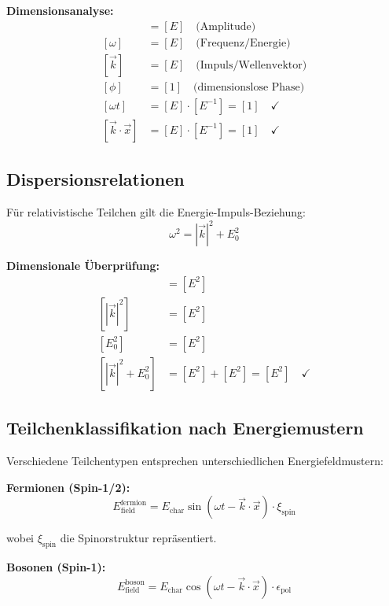 \documentclass[12pt,a4paper]{report}
\begin{document}
	\textbf{Dimensionsanalyse:}
	\begin{align}
		[E_0] &= [E] \quad \text{(Amplitude)} \\
		[\omega] &= [E] \quad \text{(Frequenz/Energie)} \\
		[\vec{k}] &= [E] \quad \text{(Impuls/Wellenvektor)} \\
		[\phi] &= [1] \quad \text{(dimensionslose Phase)} \\
		[\omega t] &= [E] \cdot [E^{-1}] = [1] \quad \checkmark \\
		[\vec{k} \cdot \vec{x}] &= [E] \cdot [E^{-1}] = [1] \quad \checkmark
	\end{align}
	
	\subsection{Dispersionsrelationen}
	\label{subsec:dispersion_relations}
	
	Für relativistische Teilchen gilt die Energie-Impuls-Beziehung:
	\begin{equation}
		\omega^2 = |\vec{k}|^2 + E_0^2
	\end{equation}
	
	\textbf{Dimensionale Überprüfung:}
	\begin{align}
		[\omega^2] &= [E^2] \\
		[|\vec{k}|^2] &= [E^2] \\
		[E_0^2] &= [E^2] \\
		[|\vec{k}|^2 + E_0^2] &= [E^2] + [E^2] = [E^2] \quad \checkmark
	\end{align}
	
	\subsection{Teilchenklassifikation nach Energiemustern}
	\label{subsec:energy_patterns}
	
	Verschiedene Teilchentypen entsprechen unterschiedlichen Energiefeldmustern:
	
	\textbf{Fermionen (Spin-1/2):}
	\begin{equation}
		E_{\text{field}}^{\text{fermion}} = E_{\text{char}} \sin(\omega t - \vec{k} \cdot \vec{x}) \cdot \xi_{\text{spin}}
	\end{equation}
	
	wobei $\xi_{\text{spin}}$ die Spinorstruktur repräsentiert.
	
	\textbf{Bosonen (Spin-1):}
	\begin{equation}
		E_{\text{field}}^{\text{boson}} = E_{\text{char}} \cos(\omega t - \vec{k} \cdot \vec{x}) \cdot \epsilon_{\text{pol}}
	\end{equation}
	
\end{document}
